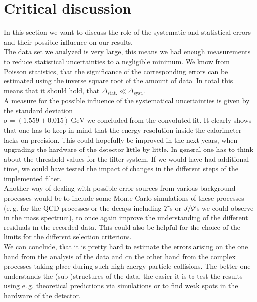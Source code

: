 \documentclass[twocolumn,
			   showpacs,%
               nofootinbib,
               aps,%
               prd,
               notitlepage,
               showkeys,
               10pt]{revtex4-1}
\begin{document}
\section{Critical discussion}
In this section we want to discuss the role of the systematic and statistical errors and their possible influence on our results.\\
The data set we analyzed is very large, this means we had enough measurements to reduce statistical uncertainties to a negligible minimum. We know from Poisson statistics, that the significance of the corresponding errors can be estimated using the inverse square root of the amount of data. In total this means that it should hold, that $\Delta_{\mathrm{stat.}} \ll \Delta_{\mathrm{syst.}}$. \\
A measure for the possible influence of the systematical uncertainties is given by the standard deviation \\ $\sigma = (1.559 \pm 0.015) \ \text{GeV}$ we concluded from the convoluted fit. It clearly shows that one has to keep in mind that the energy resolution inside the calorimeter lacks on precision. This could hopefully be improved in the next years, when upgrading the hardware of the detector little by little.  In general one has to think about the threshold values for the filter system. If we would have had additional time, we could have tested the impact of changes in the different steps of the implemented filter. \\
Another way of dealing with possible error sources from various background processes would be to include some Monte-Carlo simulations of these processes (e.\,g. for the QCD processes or the decays including $\Upsilon$'s or $J/\Psi$'s we could observe in the mass spectrum), to once again improve the understanding of the different residuals in the recorded data. This could also be helpful for the choice of the limits for the different selection criterions. \\
We can conclude, that it is pretty hard to estimate the errors arising on the one hand from the analysis of the data and on the other hand from the complex processes taking place during such high-energy particle collisions. The better one understands the (sub-)structures of the data, the easier it is to test the results using e.\,g. theoretical predictions via simulations or to find weak spots in the hardware of the detector.
\end{document}
